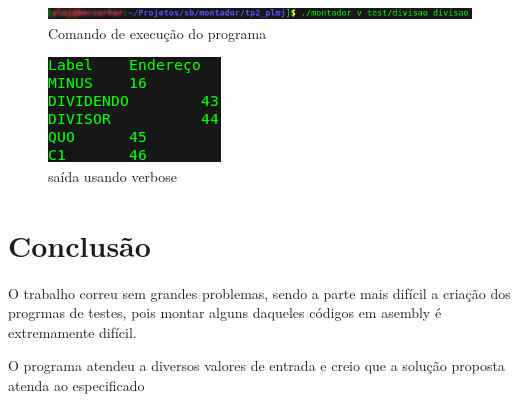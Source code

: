 \documentclass[12pt]{article}
\begin{document}
\begin{figure}[h!]
\centering
 \includegraphics[scale=0.5]{./img/exec.png}
   \caption{Comando de execução do programa}
\end{figure}

\begin{figure}[h!]
\centering
 \includegraphics[scale=0.5]{./img/teste.png}
 \caption{saída usando verbose}
\end{figure}

\section{Conclusão}
\label{conclusao}
O trabalho correu sem grandes problemas, sendo a parte mais difícil a criação
dos progrmas de testes, pois montar alguns daqueles códigos em asembly é
extremamente difícil.

O programa atendeu a diversos valores de entrada e creio que a solução proposta
atenda ao especificado
\end{document}
